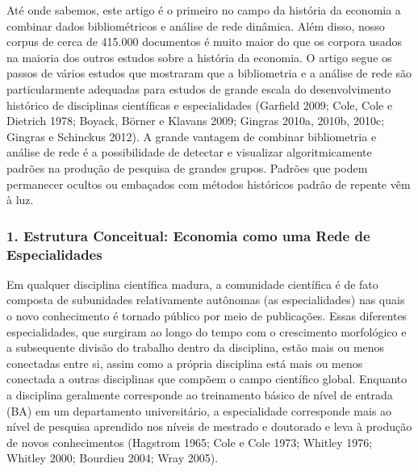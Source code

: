 \documentclass[12pt]{article}
\begin{document}
Até onde sabemos, este artigo é o primeiro no campo da história da economia a combinar dados bibliométricos e análise de rede dinâmica. Além disso, nosso corpus de cerca de 415.000 documentos é muito maior do que os corpora usados na maioria dos outros estudos sobre a história da economia. O artigo segue os passos de vários estudos que mostraram que a bibliometria e a análise de rede são particularmente adequadas para estudos de grande escala do desenvolvimento histórico de disciplinas científicas e especialidades (Garfield 2009; Cole, Cole e Dietrich 1978; Boyack, Börner e Klavans 2009; Gingras 2010a, 2010b, 2010c; Gingras e Schinckus 2012). A grande vantagem de combinar bibliometria e análise de rede é a possibilidade de detectar e visualizar algoritmicamente padrões na produção de pesquisa de grandes grupos. Padrões que podem permanecer ocultos ou embaçados com métodos históricos padrão de repente vêm à luz.

\subsubsection{\textbf{1. Estrutura Conceitual: Economia como uma Rede de Especialidades}}

Em qualquer disciplina científica madura, a comunidade científica é de fato composta de subunidades relativamente autônomas (as especialidades) nas quais o novo conhecimento é tornado público por meio de publicações. Essas diferentes especialidades, que surgiram ao longo do tempo com o crescimento morfológico e a subsequente divisão do trabalho dentro da disciplina, estão mais ou menos conectadas entre si, assim como a própria disciplina está mais ou menos conectada a outras disciplinas que compõem o campo científico global. Enquanto a disciplina geralmente corresponde ao treinamento básico de nível de entrada (BA) em um departamento universitário, a especialidade corresponde mais ao nível de pesquisa aprendido nos níveis de mestrado e doutorado e leva à produção de novos conhecimentos (Hagstrom 1965; Cole e Cole 1973; Whitley 1976; Whitley 2000; Bourdieu 2004; Wray 2005).
\end{document}
